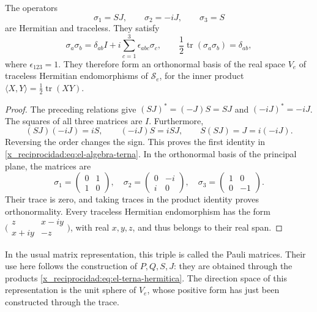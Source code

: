 \begin{proposition}
\label{x_reciprocidad:prop:el-terna-hermitica}
The operators
\begin{equation}
 \sigma_1=SJ,\qquad \sigma_2=-iJ,\qquad \sigma_3=S
 \label{x_reciprocidad:eq:el-terna-hermitica}
\end{equation}
are Hermitian and traceless. They satisfy
\begin{equation}
 \sigma_a\sigma_b
 =\delta_{ab}I+i\sum_{c=1}^3\epsilon_{abc}\sigma_c,
 \qquad
 \frac12\operatorname{tr}(\sigma_a\sigma_b)=\delta_{ab},
 \label{x_reciprocidad:eq:el-algebra-terna}
\end{equation}
where \(\epsilon_{123}=1\). They therefore form an orthonormal basis
of the real space \(V_e\) of traceless Hermitian endomorphisms of
\(\mathscr S_e\), for the inner product
\(\langle X,Y\rangle=\frac12\operatorname{tr}(XY)\).
\end{proposition}
\begin{proof}
The preceding relations give \((SJ)^*=(-J)S=SJ\) and
\((-iJ)^*=-iJ\). The squares of all three matrices are \(I\).
Furthermore,
\[
 (SJ)(-iJ)=iS,\qquad (-iJ)S=iSJ,\qquad S(SJ)=J=i(-iJ).
\]
Reversing the order changes the sign. This proves the first identity
in \eqref{x_reciprocidad:eq:el-algebra-terna}. In the orthonormal basis of the principal plane,
the matrices are
\[
 \sigma_1=\begin{pmatrix}0&1\\1&0\end{pmatrix},\quad
 \sigma_2=\begin{pmatrix}0&-i\\i&0\end{pmatrix},\quad
 \sigma_3=\begin{pmatrix}1&0\\0&-1\end{pmatrix}.
\]
Their trace is zero, and taking traces in the product identity proves
orthonormality. Every traceless Hermitian endomorphism has the form
\(\bigl(\begin{smallmatrix}z&x-iy\\x+iy&-z\end{smallmatrix}\bigr)\),
with real \(x,y,z\), and thus belongs to their real span.
\end{proof}

In the usual matrix representation, this triple is called the
Pauli matrices. Their use here follows the construction of
\(P,Q,S,J\): they are obtained through the products
\eqref{x_reciprocidad:eq:el-terna-hermitica}. The direction space of this
representation is the unit sphere of \(V_e\), whose positive form
has just been constructed through the trace.

